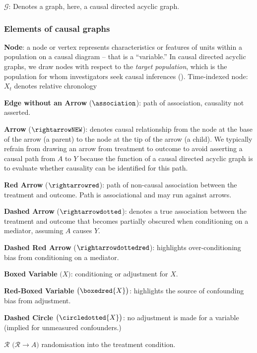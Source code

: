 \documentclass[
  single column]{article}
\begin{document}
\textbf{\(\mathcal{G}\)}: Denotes a graph, here, a causal directed
acyclic graph.

\subsubsection{Elements of causal
graphs}\label{elements-of-causal-graphs}

\textbf{Node}: a node or vertex represents characteristics or features
of units within a population on a causal diagram -- that is a
``variable.'' In causal directed acyclic graphs, we draw nodes with
respect to the \emph{target population}, which is the population for
whom investigators seek causal inferences
(). Time-indexed
node: \(X_t\) denotes relative chronology

\textbf{Edge without an Arrow} (\(\association\)): path of association,
causality not asserted.

\textbf{Arrow} (\(\rightarrowNEW\)): denotes causal relationship from
the node at the base of the arrow (a parent) to the node at the tip of
the arrow (a child). We typically refrain from drawing an arrow from
treatment to outcome to avoid asserting a causal path from \(A\) to
\(Y\) because the function of a causal directed acyclic graph is to
evaluate whether causality can be identified for this path.

\textbf{Red Arrow} (\(\rightarrowred\)): path of non-causal association
between the treatment and outcome. Path is associational and may run
against arrows.

\textbf{Dashed Arrow} (\(\rightarrowdotted\)): denotes a true
association between the treatment and outcome that becomes partially
obscured when conditioning on a mediator, assuming \(A\) causes \(Y\).

\textbf{Dashed Red Arrow} (\(\rightarrowdottedred\)): highlights
over-conditioning bias from conditioning on a mediator.

\textbf{Boxed Variable} \(\big(\boxed{X}\big)\): conditioning or
adjustment for \(X\).

\textbf{Red-Boxed Variable} \(\big(\boxedred{X}\big)\): highlights the
source of confounding bias from adjustment.

\textbf{Dashed Circle} \(\big( \circledotted{X}\big)\): no adjustment is
made for a variable (implied for unmeasured confounders.)

\textbf{\(\mathbf{\mathcal{R}}\)}
\(\big(\mathcal{R} \rightarrow A\big)\) randomisation into the treatment
condition.
\end{document}
